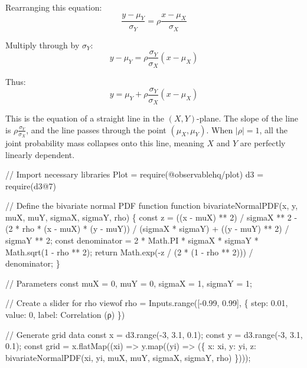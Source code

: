 \documentclass[
  letterpaper,
  DIV=11,
  numbers=noendperiod]{scrartcl}
\newenvironment{Shaded}{\begin{snugshade}}{\end{snugshade}}
\newcommand{\NormalTok}[1]{\textcolor[rgb]{0.00,0.23,0.31}{#1}}
\begin{document}
Rearranging this equation: \[
\frac{y-\mu_Y}{\sigma_Y} = \rho \frac{x-\mu_X}{\sigma_X}
\]

Multiply through by \(\sigma_Y\): \[
y - \mu_Y = \rho \frac{\sigma_Y}{\sigma_X} (x - \mu_X)
\]

Thus: \[
y = \mu_Y + \rho \frac{\sigma_Y}{\sigma_X} (x - \mu_X)
\]

This is the equation of a straight line in the \((X, Y)\)-plane. The
slope of the line is \(\rho \frac{\sigma_Y}{\sigma_X}\), and the line
passes through the point \((\mu_X, \mu_Y)\). When \(|\rho| = 1\), all
the joint probability mass collapses onto this line, meaning \(X\) and
\(Y\) are perfectly linearly dependent.

\begin{Shaded}
\begin{Highlighting}[]
\NormalTok{// Import necessary libraries}
\NormalTok{Plot = require(\textquotesingle{}@observablehq/plot\textquotesingle{})}
\NormalTok{d3 = require(\textquotesingle{}d3@7\textquotesingle{})}

\NormalTok{// Define the bivariate normal PDF function}
\NormalTok{function bivariateNormalPDF(x, y, muX, muY, sigmaX, sigmaY, rho) \{}
\NormalTok{  const z =}
\NormalTok{    ((x {-} muX) ** 2) / sigmaX ** 2 {-}}
\NormalTok{    (2 * rho * (x {-} muX) * (y {-} muY)) / (sigmaX * sigmaY) +}
\NormalTok{    ((y {-} muY) ** 2) / sigmaY ** 2;}
\NormalTok{  const denominator = 2 * Math.PI * sigmaX * sigmaY * Math.sqrt(1 {-} rho ** 2);}
\NormalTok{  return Math.exp({-}z / (2 * (1 {-} rho ** 2))) / denominator;}
\NormalTok{\}}

\NormalTok{// Parameters}
\NormalTok{const muX = 0,}
\NormalTok{  muY = 0,}
\NormalTok{  sigmaX = 1,}
\NormalTok{  sigmaY = 1;}

\NormalTok{// Create a slider for rho}
\NormalTok{viewof rho = Inputs.range([{-}0.99, 0.99], \{ step: 0.01, value: 0, label: \textquotesingle{}Correlation (ρ)\textquotesingle{} \})}

\NormalTok{// Generate grid data}
\NormalTok{const x = d3.range({-}3, 3.1, 0.1);}
\NormalTok{const y = d3.range({-}3, 3.1, 0.1);}
\NormalTok{const grid = x.flatMap((xi) =\textgreater{} y.map((yi) =\textgreater{} (\{ x: xi, y: yi, z: bivariateNormalPDF(xi, yi, muX, muY, sigmaX, sigmaY, rho) \})));}


\end{Highlighting}
\end{Shaded}
\end{document}
